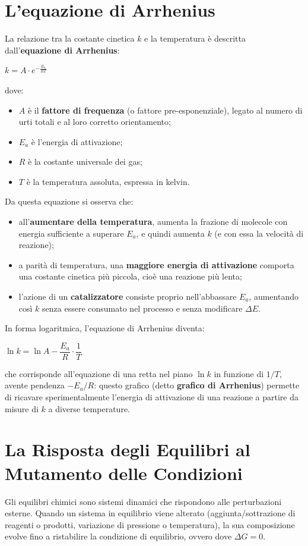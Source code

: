 \documentclass[11pt, a4paper, openright]{book}
\begin{document}
\section{L'equazione di Arrhenius}
La relazione tra la costante cinetica $k$ e la temperatura è descritta dall'\textbf{equazione di Arrhenius}:
\begin{center}
    $ k = A \cdot e^{-\frac{E_a}{RT}}$
\end{center}
dove:
\begin{itemize}
    \item $A$ è il \textbf{fattore di frequenza} (o fattore pre-esponenziale), legato al numero di urti totali e al loro corretto orientamento;
    \item $E_a$ è l'energia di attivazione;
    \item $R$ è la costante universale dei gas;
    \item $T$ è la temperatura assoluta, espressa in kelvin.
\end{itemize}
Da questa equazione si osserva che:
\begin{itemize}
    \item all'\textbf{aumentare della temperatura}, aumenta la frazione di molecole con energia sufficiente a superare $E_a$, e quindi aumenta $k$ (e con essa la velocità di reazione);
    \item a parità di temperatura, una \textbf{maggiore energia di attivazione} comporta una costante cinetica più piccola, cioè una reazione più lenta;
    \item l'azione di un \textbf{catalizzatore} consiste proprio nell'abbassare $E_a$, aumentando così $k$ senza essere consumato nel processo e senza modificare $\Delta E$.
\end{itemize}
In forma logaritmica, l'equazione di Arrhenius diventa:
\begin{center}
    $ \ln k = \ln A - \dfrac{E_a}{R} \cdot \dfrac{1}{T}$
\end{center}
che corrisponde all'equazione di una retta nel piano $\ln k$ in funzione di $1/T$, avente pendenza $-E_a/R$: questo grafico (detto \textbf{grafico di Arrhenius}) permette di ricavare sperimentalmente l'energia di attivazione di una reazione a partire da misure di $k$ a diverse temperature.

\section{La Risposta degli Equilibri al Mutamento delle Condizioni}
Gli equilibri chimici sono sistemi dinamici che rispondono alle perturbazioni esterne. Quando un sistema in equilibrio viene alterato (aggiunta/sottrazione di reagenti o prodotti, variazione di pressione o temperatura), la sua composizione evolve fino a ristabilire la condizione di equilibrio, ovvero dove $\Delta G = 0$.
\end{document}
